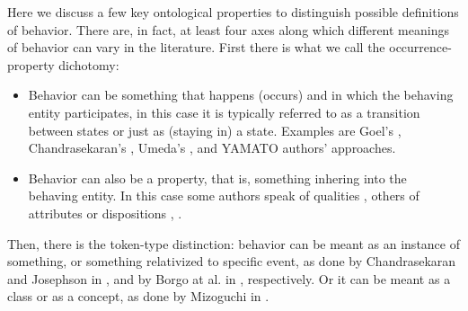 \documentclass[sw]{iosart2x}
\newcommand{\YAMATO}{\textsc{YAMATO}\xspace}
\newcommand{\stateVarCond}[1]{%
  \ifthenelse{\equal{#1}{fullSingular}}{system condition}{%
    \ifthenelse{\equal{#1}{shortSingular}}{condition}{%
      \ifthenelse{\equal{#1}{fullPlural}}{system conditions}{%
        \ifthenelse{\equal{#1}{shortPlural}}{conditions}{%
          ERROR!%
        }%
      }%
    }%
  }%
}
\newcommand{\TODO}[1]{{\color{red} #1}}
\begin{document}

Here we discuss a few key ontological properties to distinguish possible definitions of behavior.
There are, in fact, at least four %
axes along which different meanings of behavior can vary in the literature.
First there is what we call the occurrence-property dichotomy:
\begin{itemize}
  \item Behavior can be something that happens (occurs) and in which the behaving entity participates, 
  in this case it is typically referred to as a transition between states or just as (staying in) a state. 
  Examples are Goel's \cite{goelStructureBehaviorFunction2009}, Chandrasekaran's \cite{chandrasekaranFunctionDeviceRepresentation2000}, Umeda's \cite{umedaFunctionBehaviourStructure1990}, and \YAMATO authors' \cite{mizoguchiFunctionalOntologyArtifacts2009} approaches.
  \item Behavior can also be a property, that is, something inhering into the behaving entity. 
  In this case some authors speak of qualities \cite{borgoFormalOntologicalPerspective2009}, others of attributes or dispositions \cite{vermaasConceptualFrameworkJohn2007}, \cite{geroCategorisingTechnologicalKnowledge2002}.
\end{itemize} 

Then, there is the token-type distinction: behavior %
can be meant as an instance of something, or something relativized to specific event, as done by Chandrasekaran and Josephson in \cite{chandrasekaranFunctionDeviceRepresentation2000}, and by Borgo at al. in \cite{borgoFormalOntologicalPerspective2009}, respectively. Or it can be meant as a class or as a concept, as done by Mizoguchi in \cite{mizoguchiFunctionalOntologyArtifacts2009}.
\end{document}
